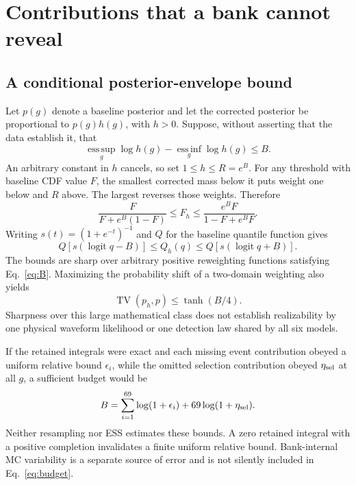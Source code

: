 \section{Contributions that a bank cannot reveal}\label{sec:support}
\subsection{A conditional posterior-envelope bound}
Let $p(g)$ denote a baseline posterior and let the corrected posterior be proportional to $p(g)h(g)$, with $h>0$. Suppose, without asserting that the data establish it, that
\begin{equation}
 \operatorname*{ess\,sup}_g\log h(g)-\operatorname*{ess\,inf}_g\log h(g)\leq B.\label{eq:B}
\end{equation}
An arbitrary constant in $h$ cancels, so set $1\leq h\leq R=e^B$. For any threshold with baseline CDF value $F$, the smallest corrected mass below it puts weight one below and $R$ above. The largest reverses those weights. Therefore
\begin{equation}
 \frac{F}{F+e^B(1-F)}\leq F_h\leq\frac{e^BF}{1-F+e^BF}.\label{eq:cdf}
\end{equation}
Writing $s(t)=(1+e^{-t})^{-1}$ and $Q$ for the baseline quantile function gives
\begin{equation}
 Q\!\left[s(\operatorname{logit}q-B)\right]\leq Q_h(q)
 \leq Q\!\left[s(\operatorname{logit}q+B)\right].\label{eq:quantile}
\end{equation}
The bounds are sharp over arbitrary positive reweighting functions satisfying Eq.~\eqref{eq:B}. Maximizing the probability shift of a two-domain weighting also yields
\begin{equation}
 \operatorname{TV}(p_h,p)\leq\tanh(B/4).
\end{equation}
Sharpness over this large mathematical class does not establish realizability by one physical waveform likelihood or one detection law shared by all six models.

If the retained integrals were exact and each missing event contribution obeyed a uniform relative bound $\epsilon_i$, while the omitted selection contribution obeyed $\eta_{\rm sel}$ at all $g$, a sufficient budget would be
\begin{equation}
 B=\sum_{i=1}^{69}\log(1+\epsilon_i)+69\log(1+\eta_{\rm sel}).\label{eq:budget}
\end{equation}
Neither resampling nor ESS estimates these bounds. A zero retained integral with a positive completion invalidates a finite uniform relative bound. Bank-internal MC variability is a separate source of error and is not silently included in Eq.~\eqref{eq:budget}.


